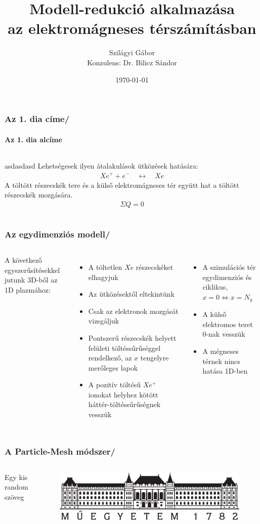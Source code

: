 \documentclass[aspectratio=43]{beamer}
\title{Modell-redukció alkalmazása\\az elektromágneses térszámításban}			%
\date{\today}
\author{Szilágyi Gábor\\[3ex]Konzulens: Dr. Bilicz Sándor}	%
\newcommand{\numframetitle}[1]{\frametitle{#1\hfill\insertframenumber/\insertpresentationendpage\hspace{-\fill}}}
\begin{document}
\maketitle	%
\begin{frame}
	\numframetitle{Az 1. dia címe}
	\framesubtitle{Az 1. dia alcíme}
	\begin{columns}	
		    asdasdasd
			Lehetségesek ilyen átalakulások ütközések hatására:
			\begin{align*}
				Xe^+ + e^- \quad \longleftrightarrow \quad Xe
			\end{align*}		
			A töltött részecskék tere és a külső elektromágneses tér együtt hat a töltött részecskék mozgására.
			\begin{align*}
				\Sigma Q = 0
			\end{align*}
	\end{columns}
\end{frame}
\begin{frame}
	\numframetitle{Az egydimenziós modell}
	\begin{columns}
		\column{0.48\textwidth}
			A következő egyszerűsítésekkel jutunk 3D-ből az 1D plazmához: \\
			\begin{itemize}
				\item A töltetlen $Xe$ részecskéket elhagyjuk
				\item Az ütközésektől eltekintünk
				\item Csak az elektronok mozgását vizsgáljuk
				\item Pontszerű részecskék helyett felületi töltéssűrűséggel rendelkező, az $x$ tengelyre merőleges lapok
				\item A pozitív töltésű $Xe^+$ ionokat helyhez kötött háttér-töltéssűrűségnek vesszük
			\end{itemize}
		\column{0.48\textwidth}
			\begin{itemize}
				\item A szimulációs tér egydimenziós és ciklikus, $x=0 \Longleftrightarrow x=N_g$
				\item A külső elektromos teret 0-nak vesszük
				\item A mégneses térnek nincs hatása 1D-ben
			\end{itemize}
	\end{columns}
\end{frame}
\begin{frame}
	\numframetitle{A Particle-Mesh módszer}
	\begin{columns}
			Egy kis random szöveg
			\begin{figure}
				\includegraphics[width=\textwidth]{bme_logo.pdf}
			\end{figure}
	\end{columns}
\end{frame}
\end{document}
